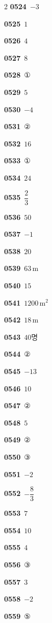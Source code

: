 \documentclass[10pt,a4paper]{article}
\begin{document}
\begin{multicols}{2}
\noindent\textbf{0524}\ $-3$\par
\noindent\textbf{0525}\ $1$\par
\noindent\textbf{0526}\ $4$\par
\noindent\textbf{0527}\ $8$\par
\noindent\textbf{0528}\ ①\par
\noindent\textbf{0529}\ $5$\par
\noindent\textbf{0530}\ $-4$\par
\noindent\textbf{0531}\ ②\par
\noindent\textbf{0532}\ $16$\par
\noindent\textbf{0533}\ ①\par
\noindent\textbf{0534}\ $24$\par
\noindent\textbf{0535}\ $\dfrac{2}{3}$\par
\noindent\textbf{0536}\ $50$\par
\noindent\textbf{0537}\ $-1$\par
\noindent\textbf{0538}\ $20$\par
\noindent\textbf{0539}\ $63\,\mathrm{m}$\par
\noindent\textbf{0540}\ $15$\par
\noindent\textbf{0541}\ $1200\,\mathrm{m}^2$\par
\noindent\textbf{0542}\ $18\,\mathrm{m}$\par
\noindent\textbf{0543}\ $40$명\par
\noindent\textbf{0544}\ ②\par
\noindent\textbf{0545}\ $-13$\par
\noindent\textbf{0546}\ $10$\par
\noindent\textbf{0547}\ ②\par
\noindent\textbf{0548}\ $5$\par
\noindent\textbf{0549}\ ②\par
\noindent\textbf{0550}\ ③\par
\noindent\textbf{0551}\ $-2$\par
\noindent\textbf{0552}\ $-\dfrac{8}{3}$\par
\noindent\textbf{0553}\ $7$\par
\noindent\textbf{0554}\ $10$\par
\noindent\textbf{0555}\ $4$\par
\noindent\textbf{0556}\ ③\par
\noindent\textbf{0557}\ $3$\par
\noindent\textbf{0558}\ $-2$\par
\noindent\textbf{0559}\ ⑤\par

\end{multicols}
\end{document}
